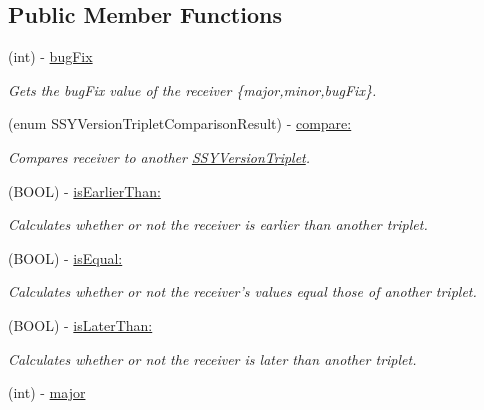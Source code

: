 \subsection*{Public Member Functions}
\begin{CompactItemize}
\item 
(int) - \hyperlink{interface_s_s_y_version_triplet_314e1db1e768f717d5c088c41facac60}{bugFix}
\begin{CompactList}\small\item\em Gets the bugFix value of the receiver \{major,minor,bugFix\}. \item\end{CompactList}\item 
(enum SSYVersionTripletComparisonResult) - \hyperlink{interface_s_s_y_version_triplet_4a0fc70cb8c34d49165e2120c001bec8}{compare:}
\begin{CompactList}\small\item\em Compares receiver to another \hyperlink{interface_s_s_y_version_triplet}{SSYVersionTriplet}. \item\end{CompactList}\item 
(BOOL) - \hyperlink{interface_s_s_y_version_triplet_73d22b05184aa3165c700c4ce40046e8}{isEarlierThan:}
\begin{CompactList}\small\item\em Calculates whether or not the receiver is earlier than another triplet. \item\end{CompactList}\item 
(BOOL) - \hyperlink{interface_s_s_y_version_triplet_0a4119de6b3e3335fe39bba2eb1479a2}{isEqual:}
\begin{CompactList}\small\item\em Calculates whether or not the receiver's values equal those of another triplet. \item\end{CompactList}\item 
(BOOL) - \hyperlink{interface_s_s_y_version_triplet_2fb9009d066b8c8170f2afaec2b0fa33}{isLaterThan:}
\begin{CompactList}\small\item\em Calculates whether or not the receiver is later than another triplet. \item\end{CompactList}\item 
(int) - \hyperlink{interface_s_s_y_version_triplet_dfc6e27ff1718983120aec644064b3f7}{major}

\end{CompactItemize}
